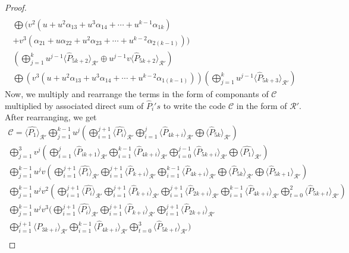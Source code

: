 \documentclass[10pt,a4paper]{amsart}
\begin{document}
\begin{proof}
\begin{gather*}
     \\  \bigoplus (v^2(u + u^2\alpha_{13} + u^3\alpha_{14} + \cdots + u^{k-1}\alpha_{1k})
       \\+ v^3( \alpha_{21} + u\alpha_{22} + u^2\alpha_{23}  + \cdots + u^{k-2}\alpha_{2(k-1)})) \\
     \left( \bigoplus_{j=1}^{k}  u^{j-1}\langle \hat{P}_{5k+2} \rangle_{\mathcal{R}'}
      \oplus u^{j-1}v\langle \hat{P}_{5k+2} \rangle_{\mathcal{R}'}\right)
     \\  \bigoplus  (v^3(u + u^2\alpha_{13} + u^3\alpha_{14} + \cdots + u^{k-2}\alpha_{1(k-1)}))
     \left( \bigoplus_{j=1}^{k}  u^{j-1}\langle \hat{P}_{5k+3} \rangle_{\mathcal{R}'}\right)
		\end{gather*}
{Now, we multiply and rearrange the terms in the form of componants of $\mathcal{C}$ multiplied by associated direct sum of $\hat{P}_{i}'s$ to write the code $\mathcal{C}$ in the form of $\mathcal{R}'.$ After rearranging, we get}
 \allowdisplaybreaks
    \begin{gather*}
        \mathcal{C} = \langle \hat{P_{1}} \rangle_{\mathcal{R}'} \bigoplus_{j=1}^{k-1} u^{j} \left( \bigoplus_{i=1}^{j+1} \langle \hat{P_i} \rangle_{\mathcal{R}'} \bigoplus_{i=1}^{j} \langle \hat{P}_{4k+i} \rangle_{\mathcal{R}'} \bigoplus \langle \hat{P}_{5k} \rangle_{\mathcal{R}'}  \right) \\
         \bigoplus_{j=1}^{3} v^{j} \left( \bigoplus_{i=1}^{j} \langle \hat{P}_{ik+1} \rangle_{\mathcal{R}'} \bigoplus_{i=1}^{k-1} \langle \hat{P}_{4k+i} \rangle_{\mathcal{R}'} \bigoplus_{i=0}^{j-1} \langle \hat{P}_{5k+i} \rangle_{\mathcal{R}'} \bigoplus \langle \hat{P_{1}} \rangle_{\mathcal{R}'}  \right) \\
          \bigoplus_{j=1}^{k-1} u^{j}v \left( \bigoplus_{i=1}^{j+1} \langle \hat{P_{i}} \rangle_{\mathcal{R}'} \bigoplus_{i=1}^{j+1} \langle \hat{P}_{k+i} \rangle_{\mathcal{R}'} \bigoplus_{i=1}^{k-1} \langle \hat{P}_{4k+i} \rangle_{\mathcal{R}'} \bigoplus \langle \hat{P}_{5k} \rangle_{\mathcal{R}'} \bigoplus \langle \hat{P}_{5k+1} \rangle_{\mathcal{R}'}  \right) \\
           \bigoplus_{j=1}^{k-1} u^{j}v^2 \left( \bigoplus_{i=1}^{j+1} \langle \hat{P_{i}} \rangle_{\mathcal{R}'} \bigoplus_{i=1}^{j+1} \langle \hat{P}_{k+i} \rangle_{\mathcal{R}'}  \bigoplus_{i=1}^{j+1} \langle \hat{P}_{2k+i} \rangle_{\mathcal{R}'} \bigoplus_{i=1}^{k-1} \langle \hat{P}_{4k+i} \rangle_{\mathcal{R}'} \bigoplus_{t=0}^{2} \langle \hat{P}_{5k+t} \rangle_{\mathcal{R}'}   \right) \\
            \bigoplus_{j=1}^{k-1} u^{j}v^3 ( \bigoplus_{i=1}^{j+1} \langle \hat{P_{i}} \rangle_{\mathcal{R}'} \bigoplus_{i=1}^{j+1} \langle \hat{P}_{k+i} \rangle_{\mathcal{R}'}  \bigoplus_{i=1}^{j+1} \langle \hat{P}_{2k+i} \rangle_{\mathcal{R}'} \\ \bigoplus_{i=1}^{j+1} \langle \hat{P}_{3k+i} \rangle_{\mathcal{R}'} \bigoplus_{i=1}^{k-1} \langle \hat{P}_{4k+i} \rangle_{\mathcal{R}'} \bigoplus_{t=0}^{3} \langle \hat{P}_{5k+t} \rangle_{\mathcal{R}'}   ) \\

\end{gather*}
\end{proof}
\end{document}
